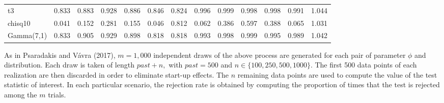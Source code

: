 \begin{table}[!h]
{\begin{tabular}[t]{lrrrrrrrrrrrr}
\hspace{1em}t3 & 0.833 & 0.883 & 0.928 & 0.886 & 0.846 & 0.824 & 0.996 & 0.999 & 0.998 & 0.998 & 0.991 & 1.044\\
\hspace{1em}chisq10 & 0.041 & 0.152 & 0.281 & 0.155 & 0.046 & 0.812 & 0.062 & 0.386 & 0.597 & 0.388 & 0.065 & 1.031\\
\hspace{1em}Gamma(7,1) & 0.833 & 0.905 & 0.929 & 0.898 & 0.818 & 0.818 & 0.993 & 0.998 & 0.999 & 0.995 & 0.989 & 1.042\\
\bottomrule
\end{tabular}}
\end{table}

As in Psaradakis and Vávra (2017), \(m=1,000\) independent draws of the above process are generated for each pair of parameter \(\phi\) and distribution. Each draw is taken of length \(past+n,\) with \(past=500\) and \(n \in \{100,250,500,1000 \}\). The first 500 data points of each realization are then discarded in order to eliminate start-up effects. The \(n\) remaining data points are used to compute the value of the test statistic of interest. In each particular scenario, the rejection rate is obtained by computing the proportion of times that the test is rejected among the \(m\) trials.

